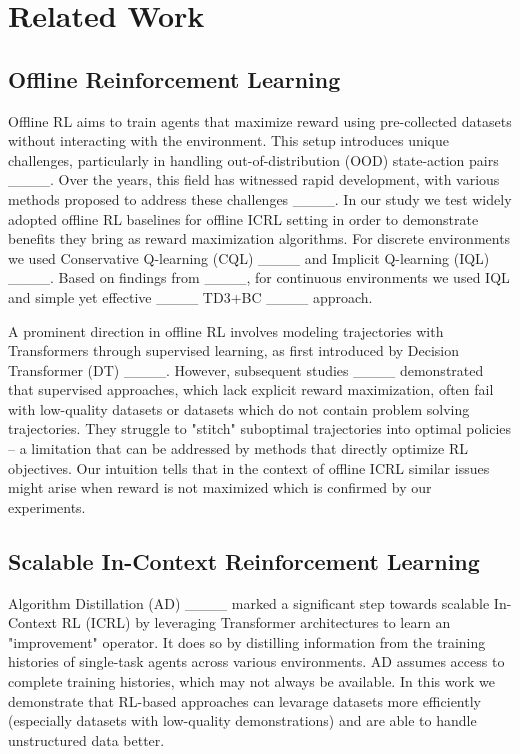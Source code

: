 \section{Related Work}
\label{related}
\subsection{Offline Reinforcement Learning}
Offline RL aims to train agents that maximize reward using pre-collected datasets without interacting with the environment. This setup introduces unique challenges, particularly in handling out-of-distribution (OOD) state-action pairs ____. Over the years, this field has witnessed rapid development, with various methods proposed to address these challenges ____. In our study we test widely adopted offline RL baselines for offline ICRL setting in order to demonstrate benefits they bring as reward maximization algorithms. For discrete environments we used Conservative Q-learning (CQL) ____ and Implicit Q-learning (IQL) ____. Based on findings from ____, for continuous environments we used IQL and simple yet effective ____ TD3+BC ____ approach.

A prominent direction in offline RL involves modeling trajectories with Transformers through supervised learning, as first introduced by Decision Transformer (DT) ____. However, subsequent studies ____ demonstrated that supervised approaches, which lack explicit reward maximization, often fail with low-quality datasets or datasets which do not contain problem solving trajectories. They struggle to "stitch" suboptimal trajectories into optimal policies -- a limitation that can be addressed by methods that directly optimize RL objectives. Our intuition tells that in the context of offline ICRL similar issues might arise when reward is not maximized which is confirmed by our experiments.

\subsection{Scalable In-Context Reinforcement Learning}
Algorithm Distillation (AD) ____ marked a significant step towards scalable In-Context RL (ICRL) by leveraging Transformer architectures to learn an "improvement" operator. It does so by distilling information from the training histories of single-task agents across various environments. AD assumes access to complete training histories, which may not always be available. In this work we demonstrate that RL-based approaches can levarage datasets more efficiently (especially datasets with low-quality demonstrations) and are able to handle unstructured data better.

